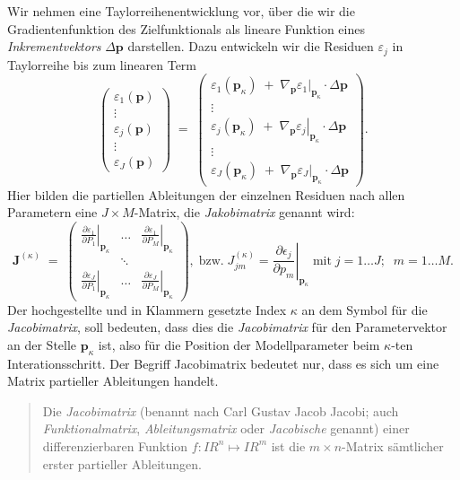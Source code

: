 Wir nehmen eine Taylorreihenentwicklung vor, über die wir die Gradientenfunktion des Zielfunktionals
als lineare Funktion eines \textsl{Inkrementvektors} $\Delta \mathbf{p}$ darstellen. Dazu entwickeln
wir die Residuen $\varepsilon_j$ in Taylorreihe bis zum linearen Term
\begin{equation}
\left(\begin{array}{c}
\varepsilon_1(\mathbf{p}) \\
\vdots \\
\varepsilon_j(\mathbf{p}) \\
\vdots \\
\varepsilon_J(\mathbf{p})
\end{array}\right)
\; = \;
\left(\begin{array}{c}
\varepsilon_1(\mathbf{p}_\kappa) \; + \; \nabla_{\mathbf{p}} \left. \varepsilon_1 \right|_{\mathbf{p}_\kappa} \cdot \Delta \mathbf{p}\\
\vdots \\
\varepsilon_j(\mathbf{p}_\kappa) \; + \; \nabla_{\mathbf{p}} \left. \varepsilon_j \right|_{\mathbf{p}_\kappa} \cdot \Delta \mathbf{p}\\
\vdots \\
\varepsilon_J(\mathbf{p}_\kappa) \; + \; \nabla_{\mathbf{p}} \left. \varepsilon_J \right|_{\mathbf{p}_\kappa} \cdot \Delta \mathbf{p}
\end{array}\right).
\label{TaylorResi1}
\end{equation}
Hier bilden die partiellen Ableitungen der einzelnen Residuen nach allen Parametern eine $J \times M$-Matrix, die \textsl{Jakobimatrix}
genannt wird:
\begin{equation}
\boldsymbol{J}^{(\kappa)} \; = \; \left(\begin{array}{ccc}
\left. \frac{\partial \varepsilon_1}{\partial P_1} \right|_{\mathbf{p}_\kappa} & \dots & \left. \frac{\partial \varepsilon_1}{\partial P_M} \right|_{\mathbf{p}_\kappa} \\
 & \ddots & \\
\left. \frac{\partial \varepsilon_J}{\partial P_1}\right|_{\mathbf{p}_\kappa} & \dots & \left. \frac{\partial \varepsilon_J}{\partial P_M}\right|_{\mathbf{p}_\kappa}
\end{array}\right) ,\; \textrm{bzw.} \; J_{jm}^{(\kappa)}= \left. \frac{\partial \epsilon_j}{\partial p_m}\right|_{\mathbf{p}_\kappa}
\;\textrm{mit} \; j=1\ldots J; \;\; m=1\ldots M.
\end{equation}
Der hochgestellte und in Klammern gesetzte Index $\kappa$
an dem Symbol für die \textsl{Jacobimatrix}, soll bedeuten,
dass dies die \textsl{Jacobimatrix} für den Parametervektor an der Stelle
$\mathbf{p}_\kappa$ ist, also für die Position der Modellparameter beim $\kappa$-ten Interationsschritt.
Der Begriff Jacobimatrix bedeutet nur, dass es
sich um eine Matrix partieller Ableitungen handelt.
\begin{quote}
Die \textsl{Jacobimatrix} (benannt nach Carl Gustav Jacob Jacobi; auch
\textsl{Funktionalmatrix}, \textsl{Ableitungsmatrix} oder \textsl{Jacobische} genannt)
einer differenzierbaren Funktion
$f\colon I \! \! R^{n} \mapsto I \! \! R ^{m}$ ist die
$m\times n$-Matrix sämtlicher erster partieller Ableitungen.
\end{quote}


